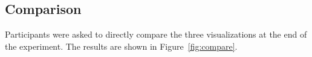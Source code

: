 

\subsection{Comparison}
Participants were asked to directly compare the three visualizations at the end of the experiment. The results are
shown in Figure~\ref{fig:compare}.

